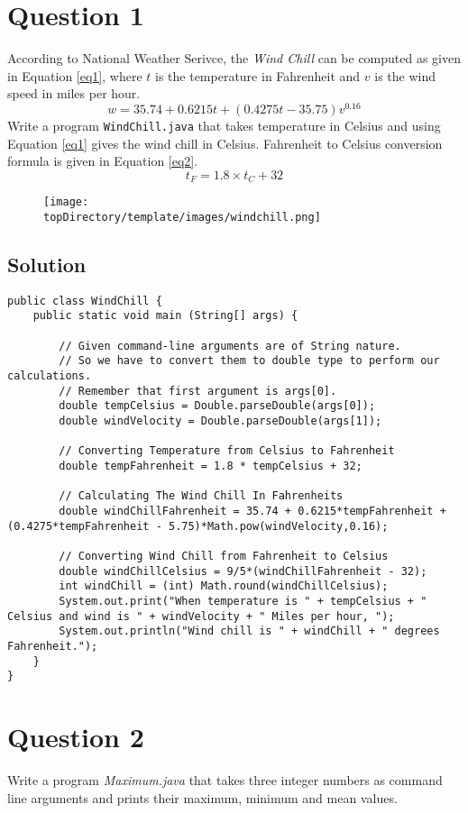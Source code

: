 \section*{Question 1}
According to National Weather Serivce, the \textit{Wind Chill} can be computed as given in Equation \ref{eq1}, where $t$ is the temperature in Fahrenheit and $v$ is the wind speed in miles per hour.
\begin{equation}
w = 35.74 + 0.6215 t + (0.4275t-35.75)v^{0.16}
\label{eq1}
\end{equation}
Write a program \texttt{WindChill.java} that takes temperature in Celsius and using Equation \ref{eq1} gives the wind chill in Celsius.
Fahrenheit to Celsius conversion formula is given in Equation \ref{eq2}.
\begin{equation}
t_F = 1.8 \times t_C + 32
\label{eq2}
\end{equation}
\begin{figure}[H]\centering
\texttt{[image: \\topDirectory/template/images/windchill.png]}
\end{figure}
\subsection*{Solution}
\lstset{language=Java}
\begin{lstlisting}
public class WindChill {
	public static void main (String[] args) {

		// Given command-line arguments are of String nature.
		// So we have to convert them to double type to perform our calculations.
		// Remember that first argument is args[0].
		double tempCelsius = Double.parseDouble(args[0]);
		double windVelocity = Double.parseDouble(args[1]);

		// Converting Temperature from Celsius to Fahrenheit
		double tempFahrenheit = 1.8 * tempCelsius + 32;

		// Calculating The Wind Chill In Fahrenheits
		double windChillFahrenheit = 35.74 + 0.6215*tempFahrenheit + (0.4275*tempFahrenheit - 5.75)*Math.pow(windVelocity,0.16);

		// Converting Wind Chill from Fahrenheit to Celsius
		double windChillCelsius = 9/5*(windChillFahrenheit - 32);
		int windChill = (int) Math.round(windChillCelsius);
		System.out.print("When temperature is " + tempCelsius + " Celsius and wind is " + windVelocity + " Miles per hour, ");
		System.out.println("Wind chill is " + windChill + " degrees Fahrenheit.");
	}
}
\end{lstlisting}
\section*{Question 2}
Write a program \textit{Maximum.java} that takes three integer numbers as command line arguments and prints their maximum, minimum and mean values.
